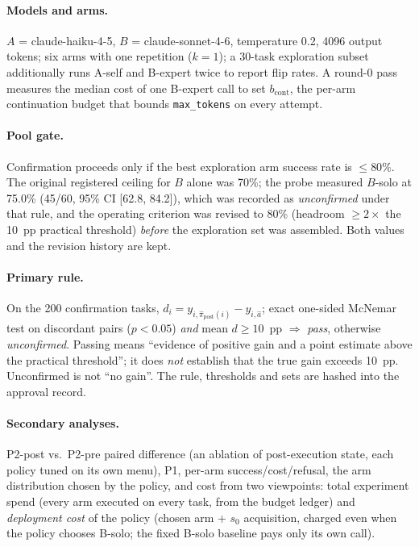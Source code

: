 \documentclass{article}
\begin{document}
\paragraph{Models and arms.} $A$ = claude-haiku-4-5, $B$ = claude-sonnet-4-6, temperature 0.2, 4096 output tokens; six arms with one
repetition ($k=1$); a 30-task exploration subset additionally runs A-self and B-expert twice to report flip rates. A round-0 pass
measures the median cost of one B-expert call to set $b_{\mathrm{cont}}$, the per-arm continuation budget that bounds
\texttt{max\_tokens} on every attempt.

\paragraph{Pool gate.} Confirmation proceeds only if the best exploration arm success rate is $\le 80\%$. The original registered
ceiling for $B$ alone was 70\%; the probe measured $B$-solo at 75.0\% (45/60, 95\% CI [62.8, 84.2]), which was recorded as
\emph{unconfirmed} under that rule, and the operating criterion was revised to 80\% (headroom $\ge 2\times$ the 10~pp practical
threshold) \emph{before} the exploration set was assembled. Both values and the revision history are kept.

\paragraph{Primary rule.} On the 200 confirmation tasks, $d_i=y_{i,\hat\pi_{\text{post}}(i)}-y_{i,\hat a}$; exact one-sided McNemar
test on discordant pairs ($p<0.05$) \emph{and} mean $d\ge 10$~pp $\Rightarrow$ \emph{pass}, otherwise \emph{unconfirmed}. Passing
means ``evidence of positive gain and a point estimate above the practical threshold''; it does \emph{not} establish that the true
gain exceeds 10~pp. Unconfirmed is not ``no gain''. The rule, thresholds and sets are hashed into the approval record.

\paragraph{Secondary analyses.} P2-post vs.\ P2-pre paired difference (an ablation of post-execution state, each policy tuned on its
own menu), P1, per-arm success/cost/refusal, the arm distribution chosen by the policy, and cost from two viewpoints: total experiment
spend (every arm executed on every task, from the budget ledger) and \emph{deployment cost} of the policy (chosen arm + $s_0$
acquisition, charged even when the policy chooses B-solo; the fixed B-solo baseline pays only its own call).
\end{document}
